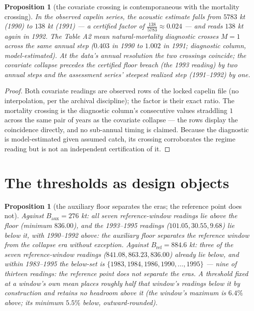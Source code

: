 \documentclass[10pt,twocolumn]{article}
\theoremstyle{plain}
\newtheorem{proposition}[theorem]{Proposition}
\theoremstyle{remark}
\begin{document}
\begin{proposition}[the covariate crossing is contemporaneous with the
mortality crossing]\label{prop:capelin}
In the observed capelin series, the acoustic estimate falls from
\(5783\) kt (1990) to \(138\) kt (1991) --- a certified factor of
\(\tfrac{138}{5783} \approx 0.024\) --- and reads \(138\) kt again in
1992. The Table A2 mean natural-mortality diagnostic crosses
\(M = 1\) across the same annual step (\(0.403\) in 1990 to \(1.002\)
in 1991; diagnostic column, model-estimated). At the data's annual
resolution the two crossings coincide; the covariate collapse precedes
the certified floor breach (the 1993 reading) by two annual steps and
the assessment series' steepest realized step (1991--1992) by one.
\end{proposition}

\begin{proof}
Both covariate readings are observed rows of the locked capelin file
(no interpolation, per the archival discipline); the factor is their
exact ratio. The mortality crossing is the diagnostic column's
consecutive values straddling \(1\) across the same pair of years as
the covariate collapse --- the rows display the coincidence directly,
and no sub-annual timing is claimed. Because the diagnostic is
model-estimated given assumed catch, its crossing corroborates the
regime reading but is not an independent certification of it.
\end{proof}

\section{The thresholds as design objects}\label{design}

\begin{proposition}[the auxiliary floor separates the eras; the
reference point does not]\label{prop:discrimination}
Against \(B_{\mathrm{aux}} = 276\) kt: all seven reference-window
readings lie above the floor (minimum \(836.00\)), and the 1993--1995
readings (\(101.05, 30.55, 9.68\)) lie below it, with 1990--1992
above: the auxiliary floor separates the reference window from the
collapse era without exception. Against
\(B_{\mathrm{ref}} = 884.6\) kt: three of the seven reference-window
readings (\(841.08, 863.23, 836.00\)) already lie below, and within
1983--1995 the below-set is \(\{1983, 1984, 1986, 1990, \dots, 1995\}\)
--- nine of thirteen readings: the reference point does not separate
the eras. A threshold fixed at a window's own mean places roughly half
that window's readings below it by construction and retains no
headroom above it (the window's maximum is \(6.4\%\) above; its
minimum \(5.5\%\) below, outward-rounded).
\end{proposition}
\end{document}
